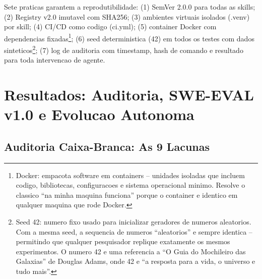 \documentclass[12pt,a4paper,oneside,sumario=tradicional,chapter=TITLE,section=TITLE,subsection=TITLE,english,brazil]{abntex2}
\begin{document}
Sete praticas garantem a reprodutibilidade: (1) SemVer 2.0.0 para todas as skills; (2) Registry v2.0 imutavel com SHA256; (3) ambientes virtuais isolados (.venv) por skill; (4) CI/CD como codigo (ci.yml); (5) container Docker com dependencias fixadas\footnote{Docker: empacota software em containers -- unidades isoladas que incluem codigo, bibliotecas, configuracoes e sistema operacional minimo. Resolve o classico ``na minha maquina funciona'' porque o container e identico em qualquer maquina que rode Docker.}; (6) seed deterministica (42) em todos os testes com dados sinteticos\footnote{Seed 42: numero fixo usado para inicializar geradores de numeros aleatorios. Com a mesma seed, a sequencia de numeros ``aleatorios'' e sempre identica -- permitindo que qualquer pesquisador replique exatamente os mesmos experimentos. O numero 42 e uma referencia a ``O Guia do Mochileiro das Galaxias'' de Douglas Adams, onde 42 e ``a resposta para a vida, o universo e tudo mais''.}; (7) log de auditoria com timestamp, hash de comando e resultado para toda intervencao de agente.

\cleardoublepage

\chapter{Resultados: Auditoria, SWE-EVAL v1.0 e Evolucao Autonoma}

\section{Auditoria Caixa-Branca: As 9 Lacunas}
\end{document}
